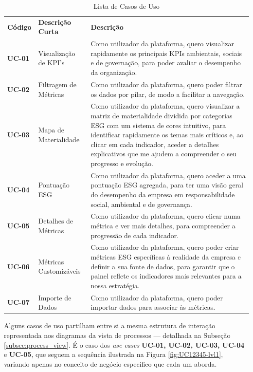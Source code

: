 \begin{table}[H]
    \renewcommand{\arraystretch}{1.2}
    \setlength{\tabcolsep}{10pt}
    \centering
    \begin{tabular}{>{\bfseries}p{3.5cm} p{4cm} p{7cm}}
        \rowcolor{orange!50}
        Código & \textbf{Descrição Curta} & \textbf{Descrição} \\
        UC-01 & Visualização de KPI's & Como utilizador da plataforma, quero visualizar rapidamente os principais KPIs ambientais, sociais e de governação, para poder avaliar o desempenho da organização. \\
        UC-02 & Filtragem de Métricas & Como utilizador da plataforma, quero poder filtrar os dados por pilar, de modo a facilitar a navegação. \\
        UC-03 & Mapa de Materialidade & Como utilizador da plataforma, quero visualizar a matriz de materialidade dividida por categorias ESG com um sistema de cores intuitivo, para identificar rapidamente os temas mais críticos e, ao clicar em cada indicador, aceder a detalhes explicativos que me ajudem a compreender o seu progresso e evolução. \\
        UC-04 & Pontuação ESG & Como utilizador da plataforma, quero aceder a uma pontuação ESG agregada, para ter uma visão geral do desempenho da empresa em responsabilidade social, ambiental e de governança. \\
        UC-05 & Detalhes de Métricas & Como utilizador da plataforma, quero clicar numa métrica e ver mais detalhes, para compreender a progressão de cada indicador. \\
        UC-06 & Métricas Customizáveis & Como utilizador da plataforma, quero poder criar métricas ESG específicas à realidade da empresa e definir a sua fonte de dados, para garantir que o painel reflete os indicadores mais relevantes para a nossa estratégia. \\
        UC-07 & Importe de Dados & Como utilizador da plataforma, quero poder importar dados para associar às métricas. \\      
    \end{tabular}
    \caption{Lista de Casos de Uso}
    \label{tab:use_cases}
\end{table}

Alguns casos de uso partilham entre si a mesma estrutura de interação representada nos diagramas da vista de processos — detalhada na Subseção \ref{subsec:process_view}. É o caso dos \textit{use cases} \textbf{UC-01, UC-02, UC-03, UC-04} e \textbf{UC-05}, que seguem a sequência ilustrada na Figura \ref{fig:UC12345-lvl1}, variando apenas no conceito de negócio específico que cada um aborda.

